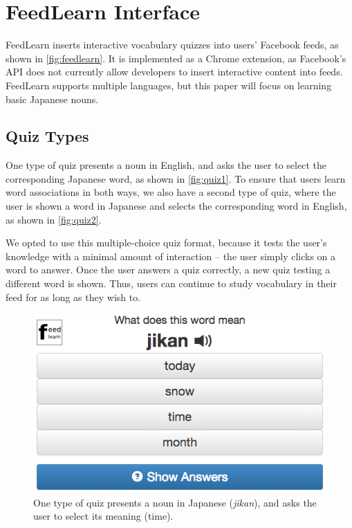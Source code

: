 \documentclass{chi-ext}
\begin{document}
\section{FeedLearn Interface}

FeedLearn inserts interactive vocabulary quizzes into users' Facebook feeds, as shown in \autoref{fig:feedlearn}. It is implemented as a Chrome extension, as Facebook's API does not currently allow developers to insert interactive content into feeds. FeedLearn supports multiple languages, but this paper will focus on learning basic Japanese nouns. %

\subsection{Quiz Types}

One type of quiz presents a noun in English, and asks the user to select the corresponding Japanese word, as shown in \autoref{fig:quiz1}. To ensure that users learn word associations in both ways, we also have a second type of quiz, where the user is shown a word in Japanese and selects the corresponding word in English, as shown in \autoref{fig:quiz2}.

We opted to use this multiple-choice quiz format, because it tests the user's knowledge with a minimal amount of interaction -- the user simply clicks on a word to answer. Once the user answers a quiz correctly, a new quiz testing a different word is shown. Thus, users can continue to study vocabulary in their feed for as long as they wish to.

\begin{figure}
\centering
\includegraphics[width=1.0\columnwidth]{quiz1}
\caption{One type of quiz presents a noun in Japanese (\textit{jikan}), and asks the user to select its meaning (time).}
\label{fig:quiz1}
\end{figure}
\end{document}
